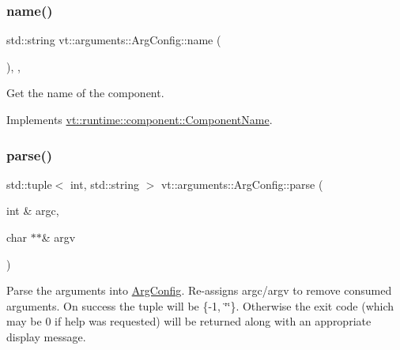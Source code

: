 \mbox{\label{structvt_1_1arguments_1_1_arg_config_ade5e5994235f0953970fc3f460f9167a}} 
\subsubsection{\texorpdfstring{name()}{name()}}
{\footnotesize\ttfamily std\+::string vt\+::arguments\+::\+Arg\+Config\+::name (\begin{DoxyParamCaption}{ }\end{DoxyParamCaption})\hspace{0.3cm}{\ttfamily [inline]}, {\ttfamily [override]}, {\ttfamily [virtual]}}



Get the name of the component. 



Implements \hyperlink{structvt_1_1runtime_1_1component_1_1_component_name_a33c06229bb605a2b2ceff68830d6d773}{vt\+::runtime\+::component\+::\+Component\+Name}.

\mbox{\label{structvt_1_1arguments_1_1_arg_config_a124125d908a910cf52c6c59a3f0f2713}} 
\subsubsection{\texorpdfstring{parse()}{parse()}}
{\footnotesize\ttfamily std\+::tuple$<$ int, std\+::string $>$ vt\+::arguments\+::\+Arg\+Config\+::parse (\begin{DoxyParamCaption}\item[{int \&}]{argc,  }\item[{char $\ast$$\ast$\&}]{argv }\end{DoxyParamCaption})}

Parse the arguments into \hyperlink{structvt_1_1arguments_1_1_arg_config}{Arg\+Config}. Re-\/assigns argc/argv to remove consumed arguments. On success the tuple will be \{-\/1, \char`\"{}\char`\"{}\}. Otherwise the exit code (which may be 0 if help was requested) will be returned along with an appropriate display message. \mbox{\label{structvt_1_1arguments_1_1_arg_config_ac6711ab96113f032b9e0a0b12d24eda3}} 
